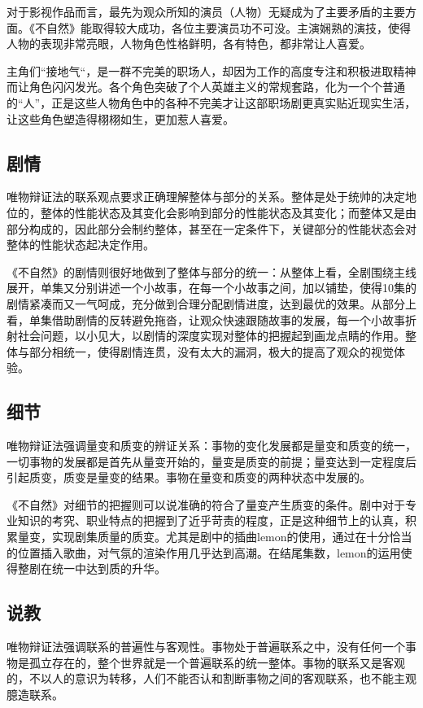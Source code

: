 \documentclass[12pt]{article}%
\begin{document}
对于影视作品而言，最先为观众所知的演员（人物）无疑成为了主要矛盾的主要方面。《不自然》能取得较大成功，各位主要演员功不可没。主演娴熟的演技，使得人物的表现非常亮眼，人物角色性格鲜明，各有特色，都非常让人喜爱。

主角们“接地气“，是一群不完美的职场人，却因为工作的高度专注和积极进取精神而让角色闪闪发光。各个角色突破了个人英雄主义的常规套路，化为一个个普通的“人”，正是这些人物角色中的各种不完美才让这部职场剧更真实贴近现实生活，让这些角色塑造得栩栩如生，更加惹人喜爱。
\subsection{剧情}
唯物辩证法的联系观点要求正确理解整体与部分的关系。整体是处于统帅的决定地位的，整体的性能状态及其变化会影响到部分的性能状态及其变化；而整体又是由部分构成的，因此部分会制约整体，甚至在一定条件下，关键部分的性能状态会对整体的性能状态起决定作用。

《不自然》的剧情则很好地做到了整体与部分的统一：从整体上看，全剧围绕主线展开，单集又分别讲述一个小故事，在每一个小故事之间，加以铺垫，使得10集的剧情紧凑而又一气呵成，充分做到合理分配剧情进度，达到最优的效果。从部分上看，单集借助剧情的反转避免拖沓，让观众快速跟随故事的发展，每一个小故事折射社会问题，以小见大，以剧情的深度实现对整体的把握起到画龙点睛的作用。整体与部分相统一，使得剧情连贯，没有太大的漏洞，极大的提高了观众的视觉体验。


\subsection{细节}
唯物辩证法强调量变和质变的辨证关系：事物的变化发展都是量变和质变的统一，一切事物的发展都是首先从量变开始的，量变是质变的前提；量变达到一定程度后引起质变，质变是量变的结果。事物在量变和质变的两种状态中发展的。

《不自然》对细节的把握则可以说准确的符合了量变产生质变的条件。剧中对于专业知识的考究、职业特点的把握到了近乎苛责的程度，正是这种细节上的认真，积累量变，实现剧集质量的质变。尤其是剧中的插曲lemon的使用，通过在十分恰当的位置插入歌曲，对气氛的渲染作用几乎达到高潮。在结尾集数，lemon的运用使得整剧在统一中达到质的升华。
\subsection{说教}
唯物辩证法强调联系的普遍性与客观性。事物处于普遍联系之中，没有任何一个事物是孤立存在的，整个世界就是一个普遍联系的统一整体。事物的联系又是客观的，不以人的意识为转移，人们不能否认和割断事物之间的客观联系，也不能主观臆造联系。
\end{document}
